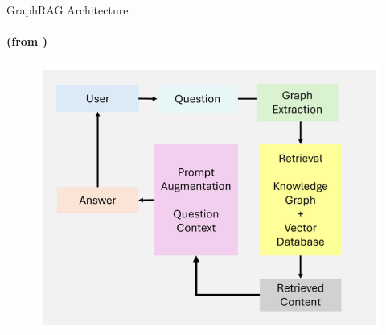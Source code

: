 \begin{frame}{GraphRAG Architecture}
\framesubtitle{(from \textcite{Singh2025})}
    \begin{figure}
        \centering
        \includegraphics[width=.7\textwidth]{../img/architecture/graphRAG.png}
    \end{figure}
    \centering
\end{frame}